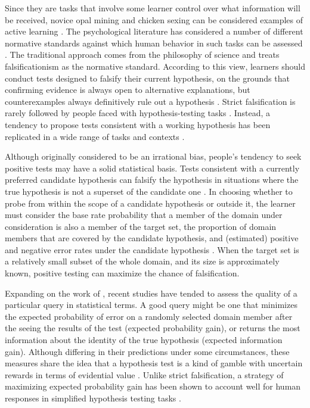 \documentclass[10pt,letterpaper]{article}
\begin{document}
Since they are tasks that involve some learner control over what information will be received, novice opal mining and chicken sexing can be considered examples of active learning \cite{settles09activelearnlitrev,gureckis2012selfdirectedlearning}. The psychological literature has considered a number of different normative standards against which human behavior in such tasks can be assessed \cite{nelson2005usefulquestions}. The traditional approach comes from the philosophy of science and treats falsificationism as the normative standard. According to this view, learners should conduct tests designed to falsify their current hypothesis, on the grounds that confirming evidence is always open to alternative explanations, but counterexamples always definitively rule out a hypothesis \cite{popper1959scidiscovery}. Strict falsification is rarely followed by people faced with hypothesis-testing tasks \cite{wason1960failure,wason1968secondlook}. Instead, a tendency to propose tests consistent with a working hypothesis has been replicated in a wide range of tasks and contexts \cite{nickerson1998confirmation}. 

Although originally considered to be an irrational bias, people's tendency to seek positive tests may have a solid statistical basis. Tests consistent with a currently preferred candidate hypothesis can falsify the hypothesis in situations where the true hypothesis is not a superset of the candidate one \cite{klayman1987confirmation}. In choosing whether to probe from within the scope of a candidate hypothesis or outside it, the learner must consider the base rate probability that a member of the domain under consideration is also a member of the target set, the proportion of domain members that are covered by the candidate hypothesis, and (estimated) positive and negative error rates under the candidate hypothesis \cite{klayman1987confirmation}. When the target set is a relatively small subset of the whole domain, and its size is approximately known, positive testing can maximize the chance of falsification.

Expanding on the work of , recent studies have tended to assess the quality of a particular query in statistical terms. A good query might be one that minimizes the expected probability of error on a randomly selected domain member after the seeing the results of the test (expected probability gain), or returns the most information about the identity of the true hypothesis (expected information gain). Although differing in their predictions under some circumstances, these measures share the idea that a hypothesis test is a kind of gamble with uncertain rewards in terms of evidential value \cite{poletiek2000gambles}. Unlike strict falsification, a strategy of maximizing expected probability gain has been shown to account well for human responses in simplified hypothesis testing tasks \cite{nelson2010probgain}. 
\end{document}
